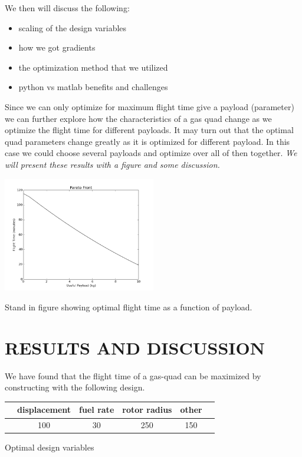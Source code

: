 \documentclass[letterpaper, 10 pt, conference]{ieeeconf}  %
\makeatletter
\newenvironment{tablehere}
  {\def\@captype{table}}
  {}
\newenvironment{figurehere}
  {\def\@captype{figure}}
  {}
\makeatother
\begin{document}
We then will discuss the following:
\begin{itemize}
	\item{scaling of the design variables}
	\item{how we got gradients}
	\item{the optimization method that we utilized}
	\item{python vs matlab benefits and challenges}
\end{itemize}

Since we can only optimize for maximum flight time give a payload (parameter) we can further explore how the characteristics of a gas quad change as we optimize the flight time for different payloads. It may turn out that the optimal quad parameters change greatly as it is optimized for different payload.  In this case we could choose several payloads and optimize over all of then together. \textit{We will present these results with a figure and some discussion.}

\begin{figurehere}
	\includegraphics[width=0.5\textwidth]{pareto_front.png}
	\caption{Stand in figure showing optimal flight time as a function of payload.}
		\label{fig:payload}
\end{figurehere}


\section{RESULTS AND DISCUSSION}

We have found that the flight time of a gas-quad can be maximized by constructing with the following design.

\begin{tablehere}
\centering
\begin{tabulary}{0.5\textwidth}{|C|C|C|C|C|C|}
\hline
       & displacement & fuel rate & rotor radius & other \\ \hline
  & 100 & 30 & 250 & 150 \\ \hline
\end{tabulary}
\caption{Optimal design variables}
\label{table:fw_loop_rates}
\end{tablehere}
\end{document}
